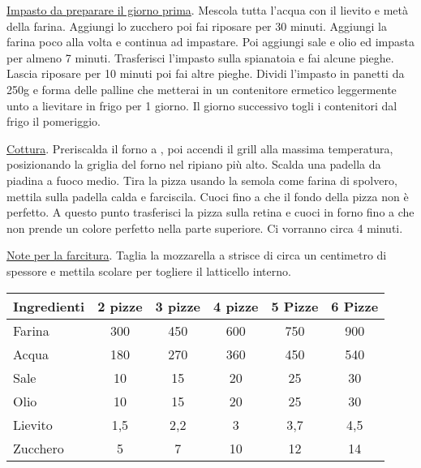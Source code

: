 \begin{method}
\underline{Impasto da preparare il giorno prima}. Mescola tutta l'acqua con il lievito e metà della farina. Aggiungi lo zucchero poi fai riposare per 30 minuti. Aggiungi la farina poco alla volta e continua ad impastare. Poi aggiungi sale e olio ed impasta per almeno 7 minuti. Trasferisci l'impasto sulla spianatoia e fai alcune pieghe. Lascia riposare per 10 minuti poi fai altre pieghe. Dividi l'impasto in panetti da 250g e forma delle palline che metterai in un contenitore ermetico leggermente unto a lievitare in frigo per 1 giorno. Il giorno successivo togli i contenitori dal frigo il pomeriggio.

\underline{Cottura}. Preriscalda il forno a , poi accendi il grill alla massima temperatura, posizionando la griglia del forno nel ripiano più alto. Scalda una padella da piadina a fuoco medio. Tira la pizza usando la semola come farina di spolvero, mettila sulla padella calda e farciscila. Cuoci fino a che il fondo della pizza non è perfetto. A questo punto trasferisci la pizza sulla retina e cuoci in forno fino a che non prende un colore perfetto nella parte superiore. Ci vorranno circa 4 minuti.

\underline{Note per la farcitura}. Taglia la mozzarella a strisce di circa un centimetro di spessore e mettila scolare per togliere il latticello interno.


\begin{table}[h]
\centering
\begin{tabular}{lccccc}
\toprule
	Ingredienti	&	2 pizze	&	3 pizze	&	4 pizze	&	5 Pizze	&	6 Pizze\\
\midrule
	Farina		&	300		&	450		&	600		&	750		&	900\\
	Acqua		&	180		&	270		&	360		&	450		&	540\\
	Sale			&	10		&	15		&	20		&	25		&	30\\
	Olio			&	10		&	15		&	20		&	25		&	30\\
	Lievito		&	1,5		&	2,2		&	3		&	3,7		&	4,5\\
	Zucchero		&	5		&	7		&	10		&	12		&	14\\
\bottomrule
\end{tabular}
\end{table}

\end{method}




